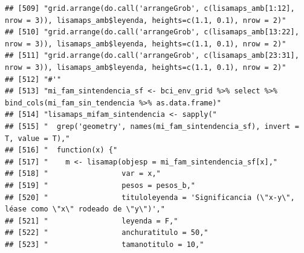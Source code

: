 \documentclass[11pt,]{article}
\begin{document}
\begin{verbatim}
## [509] "grid.arrange(do.call('arrangeGrob', c(lisamaps_amb[1:12], nrow = 3)), lisamaps_amb$leyenda, heights=c(1.1, 0.1), nrow = 2)"                                            
## [510] "grid.arrange(do.call('arrangeGrob', c(lisamaps_amb[13:22], nrow = 3)), lisamaps_amb$leyenda, heights=c(1.1, 0.1), nrow = 2)"                                           
## [511] "grid.arrange(do.call('arrangeGrob', c(lisamaps_amb[23:31], nrow = 3)), lisamaps_amb$leyenda, heights=c(1.1, 0.1), nrow = 2)"                                           
## [512] "#'"                                                                                                                                                                    
## [513] "mi_fam_sintendencia_sf <- bci_env_grid %>% select %>% bind_cols(mi_fam_sin_tendencia %>% as.data.frame)"                                                               
## [514] "lisamaps_mifam_sintendencia <- sapply("                                                                                                                                
## [515] "  grep('geometry', names(mi_fam_sintendencia_sf), invert = T, value = T),"                                                                                             
## [516] "  function(x) {"                                                                                                                                                       
## [517] "    m <- lisamap(objesp = mi_fam_sintendencia_sf[x],"                                                                                                                  
## [518] "                 var = x,"                                                                                                                                             
## [519] "                 pesos = pesos_b,"                                                                                                                                     
## [520] "                 tituloleyenda = 'Significancia (\"x-y\", léase como \"x\" rodeado de \"y\")',"                                                                        
## [521] "                 leyenda = F,"                                                                                                                                         
## [522] "                 anchuratitulo = 50,"                                                                                                                                  
## [523] "                 tamanotitulo = 10,"                                                                                                                                   

\end{verbatim}
\end{document}
